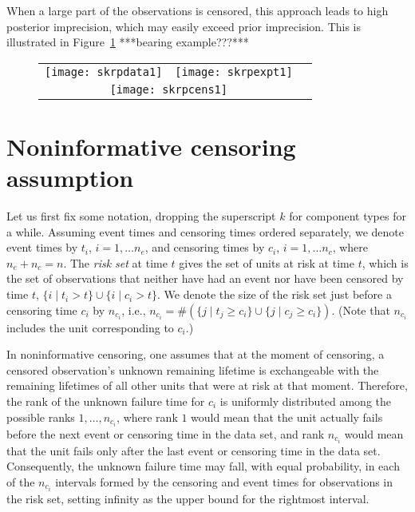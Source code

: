 \documentclass[12pt, a4paper]{elsarticle}
\begin{document}
When a large part of the observations is censored,
this approach leads to high posterior imprecision,
which may easily exceed prior imprecision.
This is illustrated in Figure~\ref{fig:skrp1} ***bearing example???***

\begin{figure}
\begin{tabular}{ccc}
\texttt{[image: skrpdata1]}%
&
\texttt{[image: skrpexpt1]}\\
\multicolumn{2}{c}{%
\texttt{[image: skrpcens1]}%
}
\end{tabular}
\caption{}
\label{fig:skrp1}
\end{figure}

\section{Noninformative censoring assumption}

Let us first fix some notation, dropping the superscript $k$ for component types for a while.
Assuming event times and censoring times ordered separately,
we denote event times by $t_i$, $i=1, \ldots n_e$,
and censoring times by $c_i$, $i=1, \ldots n_c$,
where $n_e + n_c = n$.
The \emph{risk set} at time $t$ gives the set of units at risk at time $t$,
which is the set of observations that neither have had an event nor have been censored by time $t$,
$\{ i \mid t_i > t \} \cup \{ i \mid c_i > t \}$.
We denote the size of the risk set just before a censoring time $c_i$ by $n_{c_i}$,
i.e., $n_{c_i} = \#(\{ j \mid t_j \ge c_i \} \cup \{ j \mid c_j \ge c_i \})$.
(Note that $n_{c_i}$ includes the unit corresponding to $c_i$.)

In noninformative censoring, one assumes that
at the moment of censoring, a censored observation's unknown remaining lifetime
is exchangeable with the remaining lifetimes of all other units that were at risk at that moment. %
Therefore, the rank of the unknown failure time for $c_i$ is uniformly distributed among the possible ranks $1, \ldots, n_{c_i}$,
where rank $1$ would mean that the unit actually fails before the next event or censoring time in the data set,
and rank $n_{c_i}$ would mean that the unit fails only after the last event or censoring time in the data set.
Consequently, the unknown failure time may fall, with equal probability,
in each of the $n_{c_i}$ intervals formed by the censoring and event times for observations in the risk set,
setting infinity as the upper bound for the rightmost interval.
\end{document}

